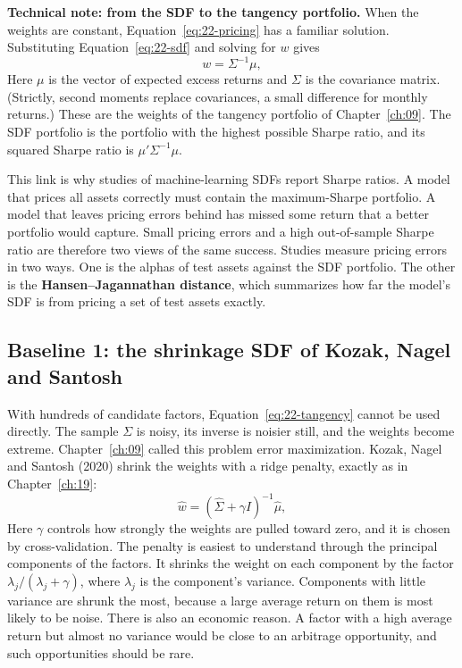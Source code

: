 \begin{technote}
\textbf{Technical note: from the SDF to the tangency portfolio.} When the weights are constant, Equation~\eqref{eq:22-pricing} has a familiar solution. Substituting Equation~\eqref{eq:22-sdf} and solving for $w$ gives
\begin{equation}
  w = \Sigma^{-1} \mu,
  \label{eq:22-tangency}
\end{equation}
Here $\mu$ is the vector of expected excess returns and $\Sigma$ is the covariance matrix. (Strictly, second moments replace covariances, a small difference for monthly returns.) These are the weights of the tangency portfolio of Chapter~\ref{ch:09}. The SDF portfolio is the portfolio with the highest possible Sharpe ratio, and its squared Sharpe ratio is $\mu'\Sigma^{-1}\mu$.
\end{technote}

This link is why studies of machine-learning SDFs report Sharpe ratios. A model that prices all assets correctly must contain the maximum-Sharpe portfolio. A model that leaves pricing errors behind has missed some return that a better portfolio would capture. Small pricing errors and a high out-of-sample Sharpe ratio are therefore two views of the same success. Studies measure pricing errors in two ways. One is the alphas of test assets against the SDF portfolio. The other is the \textbf{Hansen--Jagannathan distance}, which summarizes how far the model's SDF is from pricing a set of test assets exactly.

\subsection{Baseline 1: the shrinkage SDF of Kozak, Nagel and Santosh}

With hundreds of candidate factors, Equation~\eqref{eq:22-tangency} cannot be used directly. The sample $\Sigma$ is noisy, its inverse is noisier still, and the weights become extreme. Chapter~\ref{ch:09} called this problem error maximization. Kozak, Nagel and Santosh (2020) shrink the weights with a ridge penalty, exactly as in Chapter~\ref{ch:19}:
\begin{equation}
  \hat w = \left(\hat\Sigma + \gamma I\right)^{-1} \hat\mu,
  \label{eq:22-kns}
\end{equation}
Here $\gamma$ controls how strongly the weights are pulled toward zero, and it is chosen by cross-validation. The penalty is easiest to understand through the principal components of the factors. It shrinks the weight on each component by the factor $\lambda_j/(\lambda_j+\gamma)$, where $\lambda_j$ is the component's variance. Components with little variance are shrunk the most, because a large average return on them is most likely to be noise. There is also an economic reason. A factor with a high average return but almost no variance would be close to an arbitrage opportunity, and such opportunities should be rare.

